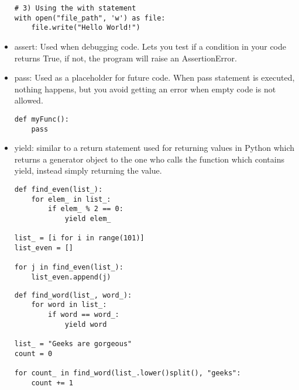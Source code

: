 \documentclass[a4paper, 12pt]{article}
\begin{document}
\begin{itemize}
\begin{tcolorbox}
\begin{lstlisting}
# 3) Using the with statement
with open("file_path", 'w') as file:
	file.write("Hello World!")
\end{lstlisting}
\end{tcolorbox}
\item{assert: Used when debugging code. Lets you test if a condition in your code returns True, if not, the program will raise an AssertionError.}
\item{pass: Used as a placeholder for future code. When pass statement is executed, nothing happens, but you avoid getting an error when empty code is not allowed.}
\begin{tcolorbox}
\begin{lstlisting}
def myFunc():
	pass
\end{lstlisting}
\end{tcolorbox}
\item{yield: similar to a return statement used for returning values in Python which returns a generator object to the one who calls the function which contains yield, instead simply returning the value.}
\begin{tcolorbox}
\begin{lstlisting}
def find_even(list_):
	for elem_ in list_:
		if elem_ % 2 == 0:
			yield elem_
			
list_ = [i for i in range(101)]
list_even = []

for j in find_even(list_):
	list_even.append(j)
\end{lstlisting}
\end{tcolorbox}

\pagebreak

\begin{tcolorbox}
\begin{lstlisting}
def find_word(list_, word_):
	for word in list_:
		if word == word_:
			yield word
			
list_ = "Geeks are gorgeous"
count = 0

for count_ in find_word(list_.lower()split(), "geeks":
	count += 1
	

\end{lstlisting}
\end{tcolorbox}
\end{itemize}
\end{document}

